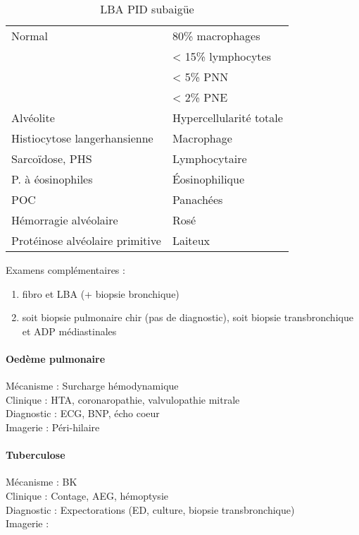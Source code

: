 \documentclass[11pt]{article}
\begin{document}
\begin{table}[htbp]
  \caption{LBA PID subaigüe}
  \centering
  \begin{tabular}{ll}
    \toprule
    Normal & 80\% macrophages\\
           & < 15\% lymphocytes\\
           & < 5\% PNN\\
           & < 2\% PNE\\
    \midrule
    Alvéolite & Hypercellularité totale\\
    Histiocytose langerhansienne & Macrophage\\
    Sarcoïdose, PHS & Lymphocytaire\\
    P. à éosinophiles & Éosinophilique\\
    \gls{POC} & Panachées\\
    Hémorragie alvéolaire & Rosé\\
    Protéinose alvéolaire primitive & Laiteux\\
    \bottomrule
  \end{tabular}
\end{table}

Examens complémentaires :
\begin{enumerate}
\item fibro et LBA (+ biopsie bronchique)
\item soit biopsie pulmonaire chir (pas de diagnostic), soit biopsie
transbronchique et ADP médiastinales
\end{enumerate}

\paragraph{Oedème pulmonaire}
\label{sec:org7702a11}
Mécanisme : Surcharge hémodynamique\\
Clinique : HTA, coronaropathie, valvulopathie mitrale\\
Diagnostic : ECG, BNP, écho coeur\\
Imagerie : Péri-hilaire

\paragraph{Tuberculose}
\label{sec:orga64806f}
Mécanisme : BK\\
Clinique : Contage, AEG, hémoptysie\\
Diagnostic : Expectorations (ED, culture, biopsie transbronchique)\\
Imagerie : 
\end{document}
